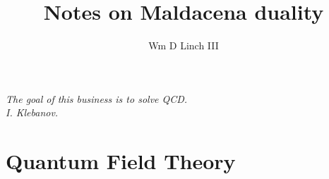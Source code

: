 \documentclass[12pt]{article}
\title%
{Notes on Maldacena duality}
\author{Wm D Linch III}
\date{}                                           %
\begin{document}
\maketitle

\tableofcontents

\newpage

\section*{}
{
\begin{flushright}
{\it The goal of this business is to solve QCD.\\
I. Klebanov.}
\end{flushright}
}

\section{Quantum Field Theory}

\end{document}
